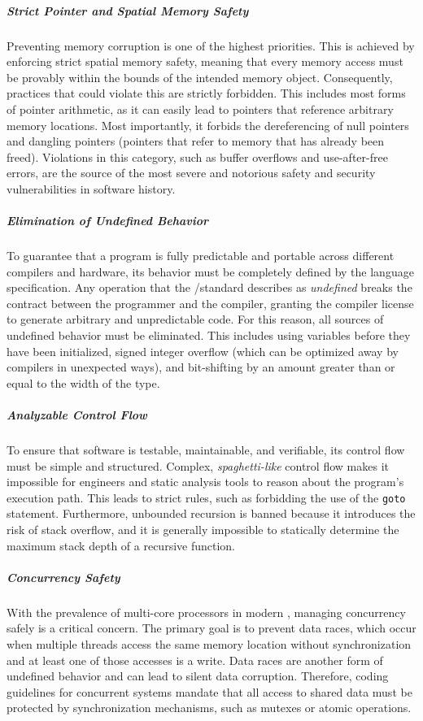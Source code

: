 \subparagraph{Strict Pointer and Spatial Memory Safety}
Preventing memory corruption is one of the highest priorities. This is achieved by
enforcing strict spatial memory safety, meaning that every memory access must be provably
within the bounds of the intended memory object. Consequently, practices that could
violate this are strictly forbidden. This includes most forms of pointer arithmetic, as
it can easily lead to pointers that reference arbitrary memory locations. Most
importantly, it forbids the dereferencing of null pointers and dangling pointers (pointers
that refer to memory that has already been freed). Violations in this category, such as
buffer overflows and use-after-free errors, are the source of the most severe and
notorious safety and security vulnerabilities in software history.

\subparagraph{Elimination of Undefined Behavior}
To guarantee that a program is fully predictable and portable across different compilers
and hardware, its behavior must be completely defined by the language specification. Any
operation that the \Ci/\Cpp standard describes as \emph{undefined} breaks the contract between
the programmer and the compiler, granting the compiler license to generate arbitrary and
unpredictable code. For this reason, all sources of undefined behavior must be
eliminated. This includes using variables before they have been initialized, signed
integer overflow (which can be optimized away by compilers in unexpected ways), and
bit-shifting by an amount greater than or equal to the width of the type.

\subparagraph{Analyzable Control Flow}
To ensure that software is testable, maintainable, and verifiable, its control flow must
be simple and structured. Complex, \emph{spaghetti-like} control flow makes it impossible for
engineers and static analysis tools to reason about the program's execution path. This
leads to strict rules, such as forbidding the use of the \texttt{goto} statement.
Furthermore, unbounded recursion is banned because it introduces the risk of stack
overflow, and it is generally impossible to statically determine the maximum stack depth
of a recursive function.

\subparagraph{Concurrency Safety}
With the prevalence of multi-core processors in modern \ecus, managing concurrency safely
is a critical concern. The primary goal is to prevent data races, which occur when
multiple threads access the same memory location without synchronization and at least one
of those accesses is a write. Data races are another form of undefined behavior and can
lead to silent data corruption. Therefore, coding guidelines for concurrent systems
mandate that all access to shared data must be protected by synchronization mechanisms,
such as mutexes or atomic operations.

